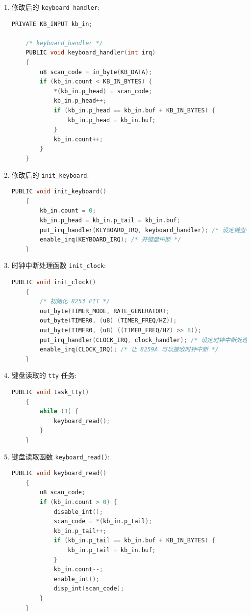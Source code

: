 \begin{enumerate}
    \item 修改后的 \texttt{keyboard\_handler}:
    \begin{lstlisting}[language=C]
    PRIVATE KB_INPUT kb_in;
    
    /* keyboard_handler */
    PUBLIC void keyboard_handler(int irq)
    {
        u8 scan_code = in_byte(KB_DATA);
        if (kb_in.count < KB_IN_BYTES) {
            *(kb_in.p_head) = scan_code;
            kb_in.p_head++;
            if (kb_in.p_head == kb_in.buf + KB_IN_BYTES) {
                kb_in.p_head = kb_in.buf;
            }
            kb_in.count++;
        }
    }
    \end{lstlisting}
    
    \item 修改后的 \texttt{init\_keyboard}:
    \begin{lstlisting}[language=C]
    PUBLIC void init_keyboard()
    {
        kb_in.count = 0;
        kb_in.p_head = kb_in.p_tail = kb_in.buf;
        put_irq_handler(KEYBOARD_IRQ, keyboard_handler); /* 设定键盘中断处理程序 */
        enable_irq(KEYBOARD_IRQ); /* 开键盘中断 */
    }
    \end{lstlisting}
    
    \item 时钟中断处理函数 \texttt{init\_clock}:
    \begin{lstlisting}[language=C]
    PUBLIC void init_clock()
    {
        /* 初始化 8253 PIT */
        out_byte(TIMER_MODE, RATE_GENERATOR);
        out_byte(TIMER0, (u8) (TIMER_FREQ/HZ));
        out_byte(TIMER0, (u8) ((TIMER_FREQ/HZ) >> 8));
        put_irq_handler(CLOCK_IRQ, clock_handler); /* 设定时钟中断处理程序 */
        enable_irq(CLOCK_IRQ); /* 让 8259A 可以接收时钟中断 */
    }
    \end{lstlisting}
    
    \item 键盘读取的 \texttt{tty} 任务:
    \begin{lstlisting}[language=C]
    PUBLIC void task_tty()
    {
        while (1) {
            keyboard_read();
        }
    }
    \end{lstlisting}
    
    \item 键盘读取函数 \texttt{keyboard\_read()}:
    \begin{lstlisting}[language=C]
    PUBLIC void keyboard_read()
    {
        u8 scan_code;
        if (kb_in.count > 0) {
            disable_int();
            scan_code = *(kb_in.p_tail);
            kb_in.p_tail++;
            if (kb_in.p_tail == kb_in.buf + KB_IN_BYTES) {
                kb_in.p_tail = kb_in.buf;
            }
            kb_in.count--;
            enable_int();
            disp_int(scan_code);
        }
    }
    \end{lstlisting}
    

\end{enumerate}
